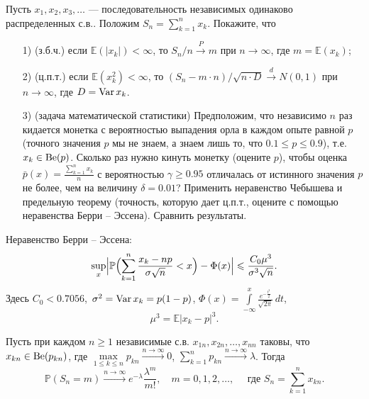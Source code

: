 \begin{problem}
Пусть $x_1, x_2, x_3, \ldots$ --- последовательность независимых одинаково распределенных с.в.. Положим 
$S_n=\sum\limits_{k=1}^{n} x_k$. Покажите, что 

\begin{enumerate}
\item[1)](з.б.ч.) если ${\mathbb E}(|x_k|)<\infty$, то $S_n/n\xrightarrow{P} m$ при $n\to\infty$, где $m={\mathbb E}(x_k)$; 

\item[2)](ц.п.т.) если ${\mathbb E}(x_k^2)<\infty$, то $(S_n-m\cdot n)/\sqrt{n\cdot D}\xrightarrow{d} N(0,1)$ при $n\to\infty$, 
где $D=\mathop{\mathrm{Var}}\nolimits x_k$. 

\item[3)](задача математической статистики) Предположим, что независимо $n$ раз кидается монетка с вероятностью выпадения орла в каждом 
опыте равной $p$ (точного значения $p$ мы не знаем, а знаем лишь то, что $0.1\leqslant p\leqslant 0.9$), т.е. $x_k\in\mathrm{Be}(p)$. 
Сколько раз нужно кинуть монетку (оцените $p$), чтобы оценка ${\bar p}(x)=\frac{\sum\limits_{k=1}^{n}x_k}{n}$ с вероятностью 
$\gamma\geqslant 0.95$ отличалась от истинного значения $p$ не более, чем на величину $\delta=0.01$? Применить неравенство Чебышева 
и предельную теорему (точность, которую дает ц.п.т., оцените с помощью неравенства Берри – Эссена). Сравнить результаты. 
\end{enumerate}
\end{problem}

\begin{ordre}

Неравенство Берри – Эссена: 
$$
\sup\limits_{x} \Bigl|{\mathbb P}\Bigl(\sum\limits_{k=1}^{n}\frac{x_k-np}{\sigma\sqrt{n}}<x\Bigr)-\Phi(x)\Bigr|\leqslant 
\frac{C_0\mu^3}{\sigma^3\sqrt{n}} . 
$$
Здесь $C_0<0.7056$, $\,\sigma^2=\mathop{\mathrm{Var}}\nolimits x_k=p(1-p)$, $\Phi(x)=\int\limits_{-\infty}^{x}\tfrac{e^{-\frac{t^2}{2}}}{\sqrt{2\pi}}\, dt$, 
$$
\mu^3={\mathbb E}|x_k-p|^3. 
$$

\end{ordre}


\begin{problem}
Пусть при каждом $n\geqslant 1$ независимые с.в. $x_{1n}, x_{2n},\ldots, x_{nn}$ таковы, что $x_{kn}\in \mathrm{Be}(p_{kn})$, где 
$\max\limits_{1\leqslant k\leqslant n} p_{kn}\xrightarrow{n\to\infty}0$, $\sum\limits_{k=1}^{n}p_{kn}\xrightarrow{n\to\infty}\lambda$. 
Тогда 
\begin{equation}
\label{TPois}
{\mathbb P}(S_n=m)\xrightarrow{n\to\infty} e^{-\lambda}\frac{\lambda^m}{m!}, \quad m=0,1,2,\ldots, \quad 
\text{ где } S_n=\sum\limits_{k=1}^{n} x_{kn} . 
\end{equation}
\end{problem}

